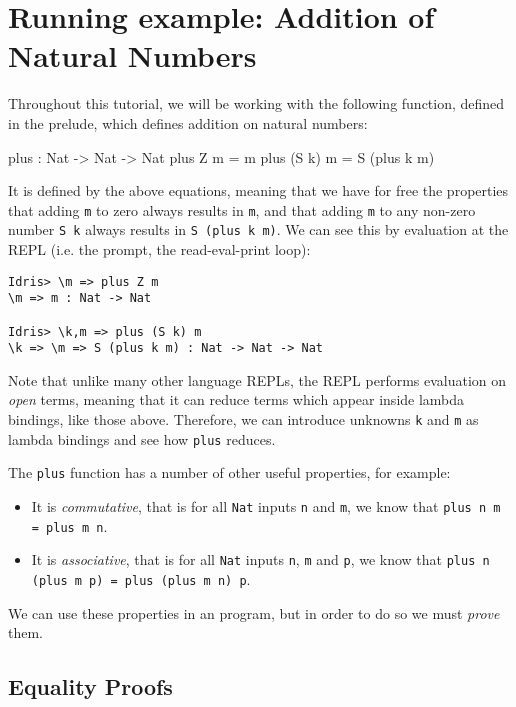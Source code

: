 \section{Running example: Addition of Natural Numbers}

Throughout this tutorial, we will be working with the following function,
defined in the \Idris{} prelude, which defines addition on natural numbers:

\begin{code}
plus : Nat -> Nat -> Nat
plus Z     m = m
plus (S k) m = S (plus k m)
\end{code}

\noindent
It is defined by the above equations, meaning that we have for free the
properties that adding \texttt{m} to zero always results in \texttt{m},
and that adding \texttt{m} to any non-zero number \texttt{S k} always results 
in \texttt{S (plus k m)}. We can see this by evaluation at the \Idris{}
REPL (i.e. the prompt, the read-eval-print loop):

\begin{lstlisting}
Idris> \m => plus Z m
\m => m : Nat -> Nat

Idris> \k,m => plus (S k) m
\k => \m => S (plus k m) : Nat -> Nat -> Nat
\end{lstlisting}

\noindent
Note that unlike many other language REPLs, the \Idris{} REPL performs
evaluation on \emph{open} terms, meaning that it can reduce terms which appear
inside lambda bindings, like those above. Therefore, we can introduce unknowns
\texttt{k} and \texttt{m} as lambda bindings and see how \texttt{plus}
reduces.

The \texttt{plus} function has a number of other useful properties, for
example:

\begin{itemize}
\item It is \emph{commutative}, that is for all \texttt{Nat} inputs
\texttt{n} and \texttt{m}, we know that \texttt{plus n m = plus m n}.
\item It is \emph{associative}, that is for all \texttt{Nat} inputs
\texttt{n}, \texttt{m} and \texttt{p}, 
we know that \texttt{plus n (plus m p) = plus (plus m n) p}.
\end{itemize}

\noindent
We can use these properties in an \Idris{} program, but in order to do so we
must \emph{prove} them.

\subsection{Equality Proofs}

